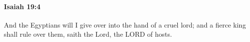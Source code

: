
		\paragraph{Isaiah 19:4} %
			\label{ISAIAH-19-4}

			And the Egyptians will I give over into the hand of a cruel lord; and a fierce king shall rule over them, saith the Lord, the LORD of hosts.


